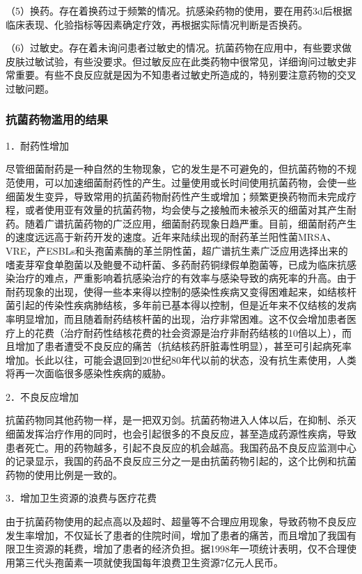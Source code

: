 （5）换药。存在着换药过于频繁的情况。抗感染药物的使用，要在用药3d后根据临床表现、化验指标等因素确定疗效，再根据实际情况判断是否换药。

（6）过敏史。存在着未询问患者过敏史的情况。抗菌药物在应用中，有些要求做皮肤过敏试验，有些没要求。但过敏反应在此类药物中很常见，详细询问过敏史非常重要。有些不良反应就是因为不知患者过敏史所造成的，特别要注意药物的交叉过敏问题。

\subsubsection{抗菌药物滥用的结果}

1．耐药性增加

尽管细菌耐药是一种自然的生物现象，它的发生是不可避免的，但抗菌药物的不规范使用，可以加速细菌耐药性的产生。过量使用或长时间使用抗菌药物，会使一些细菌发生变异，导致常用的抗菌药物耐药性产生或增加；频繁更换药物而未完成疗程，或者使用亚有效量的抗菌药物，均会使与之接触而未被杀灭的细菌对其产生耐药。随着广谱抗菌药物的广泛应用，细菌耐药现象日趋严重。目前，细菌耐药产生的速度远远高于新药开发的速度。近年来陆续出现的耐药革兰阳性菌MRSA、VRE，产ESBLs和头孢菌素酶的革兰阴性菌，超广谱抗生素广泛应用选择出来的嗜麦芽窄食单胞菌以及鲍曼不动杆菌、多药耐药铜绿假单胞菌等，已成为临床抗感染治疗的难点，严重影响着抗感染治疗的有效率与感染导致的病死率的升高。由于耐药现象的出现，使得一些本来得以控制的感染性疾病又变得困难起来，如结核杆菌引起的传染性疾病肺结核，多年前已基本得以控制，但是近年来不仅结核的发病率明显增加，而且随着耐药结核杆菌的出现，治疗非常困难。这不仅会增加患者医疗上的花费（治疗耐药性结核花费的社会资源是治疗非耐药结核的10倍以上），而且增加了患者遭受不良反应的痛苦（抗结核药肝脏毒性明显），甚至可引起病死率增加。长此以往，可能会退回到20世纪80年代以前的状态，没有抗生素使用，人类将再一次面临很多感染性疾病的威胁。

2．不良反应增加

抗菌药物同其他药物一样，是一把双刃剑。抗菌药物进入人体以后，在抑制、杀灭细菌发挥治疗作用的同时，也会引起很多的不良反应，甚至造成药源性疾病，导致患者死亡。用的药物越多，引起不良反应的机会越高。我国药品不良反应监测中心的记录显示，我国的药品不良反应三分之一是由抗菌药物引起的，这个比例和抗菌药物的使用比例是一致的。

3．增加卫生资源的浪费与医疗花费

由于抗菌药物使用的起点高以及超时、超量等不合理应用现象，导致药物不良反应发生率增加，不仅延长了患者的住院时间，增加了患者的痛苦，而且增加了我国有限卫生资源的耗费，增加了患者的经济负担。据1998年一项统计表明，仅不合理使用第三代头孢菌素一项就使我国每年浪费卫生资源7亿元人民币。

